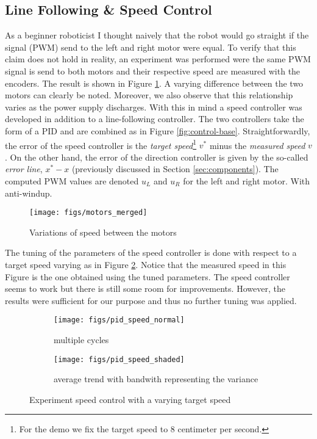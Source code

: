 \documentclass[12pt]{report}
\begin{document}
\subsection*{Line Following \& Speed Control}\label{sec:line-control}
As a beginner roboticist I thought naively that the robot would go straight if the signal (PWM) send to the left and right motor were equal. To verify that this claim does not hold in reality, an experiment was performed were the same PWM signal is send to both motors and their respective speed are measured with the encoders. The result is shown in Figure \ref{fig:probs-control}. A varying difference between the two motors can clearly be noted. Moreover, we also observe that this relationship varies as the power supply discharges. With this in  mind a speed controller was developed in addition to a line-following controller. The two controllers take the form of a PID and are combined as in Figure \ref{fig:control-base}. Straightforwardly, the error of the speed controller is the \textit{target speed}\footnote{For the demo we fix the target speed to 8 centimeter per second.} $v^*$ minus the \textit{measured speed} $v$. On the other hand, the error of the direction controller is given by the so-called \textit{error line}, $x^*-x$ (previously discussed in Section \ref{sec:components}). The computed PWM values are denoted $u_L$ and $u_R$ for the left and right motor. With anti-windup.
\begin{figure}[!h]
  \centering
  \texttt{[image: figs/motors\_merged]}
\caption{Variations of speed between the motors}
\label{fig:probs-control}
\end{figure}

The tuning of the parameters of the speed controller is done with respect to a target speed varying as in Figure \ref{fig:tuning}. Notice that the measured speed in this Figure is the one obtained using the tuned parameters. The speed controller seems to work but there is still some room for improvements. However, the results were sufficient for our purpose and thus no further tuning was applied. 
\begin{figure}[!h]
\centering
\begin{subfigure}{.5\textwidth}
  \centering
  \texttt{[image: figs/pid\_speed\_normal]}
  \caption{multiple cycles}
\end{subfigure}%
\begin{subfigure}{.5\textwidth}
  \centering
  \texttt{[image: figs/pid\_speed\_shaded]}
  \caption{average trend with bandwith representing the variance}
\end{subfigure}
\caption{Experiment speed control with a varying target speed}
\label{fig:tuning}
\end{figure}
\end{document}
